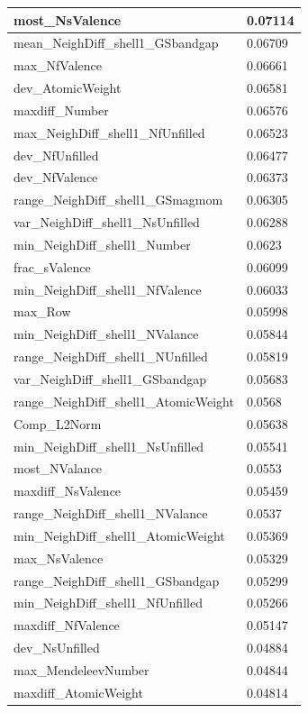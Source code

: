 \begin{longtable}{|l|l|}
most\_NsValence & 0.07114 \\ \hline
mean\_NeighDiff\_shell1\_GSbandgap & 0.06709 \\ \hline
max\_NfValence & 0.06661 \\ \hline
dev\_AtomicWeight & 0.06581 \\ \hline
maxdiff\_Number & 0.06576 \\ \hline
max\_NeighDiff\_shell1\_NfUnfilled & 0.06523 \\ \hline
dev\_NfUnfilled & 0.06477 \\ \hline
dev\_NfValence & 0.06373 \\ \hline
range\_NeighDiff\_shell1\_GSmagmom & 0.06305 \\ \hline
var\_NeighDiff\_shell1\_NsUnfilled & 0.06288 \\ \hline
min\_NeighDiff\_shell1\_Number & 0.0623 \\ \hline
frac\_sValence & 0.06099 \\ \hline
min\_NeighDiff\_shell1\_NfValence & 0.06033 \\ \hline
max\_Row & 0.05998 \\ \hline
min\_NeighDiff\_shell1\_NValance & 0.05844 \\ \hline
range\_NeighDiff\_shell1\_NUnfilled & 0.05819 \\ \hline
var\_NeighDiff\_shell1\_GSbandgap & 0.05683 \\ \hline
range\_NeighDiff\_shell1\_AtomicWeight & 0.0568 \\ \hline
Comp\_L2Norm & 0.05638 \\ \hline
min\_NeighDiff\_shell1\_NsUnfilled & 0.05541 \\ \hline
most\_NValance & 0.0553 \\ \hline
maxdiff\_NsValence & 0.05459 \\ \hline
range\_NeighDiff\_shell1\_NValance & 0.0537 \\ \hline
min\_NeighDiff\_shell1\_AtomicWeight & 0.05369 \\ \hline
max\_NsValence & 0.05329 \\ \hline
range\_NeighDiff\_shell1\_GSbandgap & 0.05299 \\ \hline
min\_NeighDiff\_shell1\_NfUnfilled & 0.05266 \\ \hline
maxdiff\_NfValence & 0.05147 \\ \hline
dev\_NsUnfilled & 0.04884 \\ \hline
max\_MendeleevNumber & 0.04844 \\ \hline
maxdiff\_AtomicWeight & 0.04814 \\ \hline

\end{longtable}
